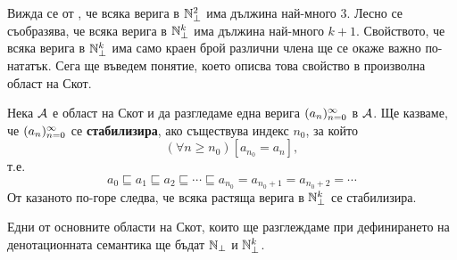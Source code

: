 Вижда се от , че всяка верига в $\mathbb{N}^2_\bot$ има дължина най-много $3$.
Лесно се съобразява, че всяка верига в $\mathbb{N}^k_\bot$ има дължина най-много $k+1$.
Свойството, че всяка верига в $\mathbb{N}^k_\bot$ има само краен брой различни члена
ще се окаже важно по-нататък. Сега ще въведем понятие, което описва това свойство в произволна област на Скот.

Нека $\mathcal{A}$ е област на Скот и да разгледаме една верига $(a_{n})^{\infty}_{n=0}$ в $\mathcal{A}$.
Ще казваме, че $(a_{n})^{\infty}_{n=0}$ се {\bf стабилизира}, ако съществува индекс $n_0$, за който
\[(\forall n \geq n_0)[a_{n_0} = a_{n}],\]
т.е.
\[a_0 \sqsubseteq a_1 \sqsubseteq a_2 \sqsubseteq \cdots \sqsubseteq a_{n_0} = a_{n_0+1} = a_{n_0+2} = \cdots\]
От казаното по-горе следва, че всяка растяща верига в $\mathbb{N}^k_\bot$ се стабилизира.

\begin{remark}
  Едни от основните области на Скот, които ще разглеждаме при дефинирането на денотационната семантика
  ще бъдат $\mathbb{N}_\bot$ и $\mathbb{N}^k_\bot$.
\end{remark}


